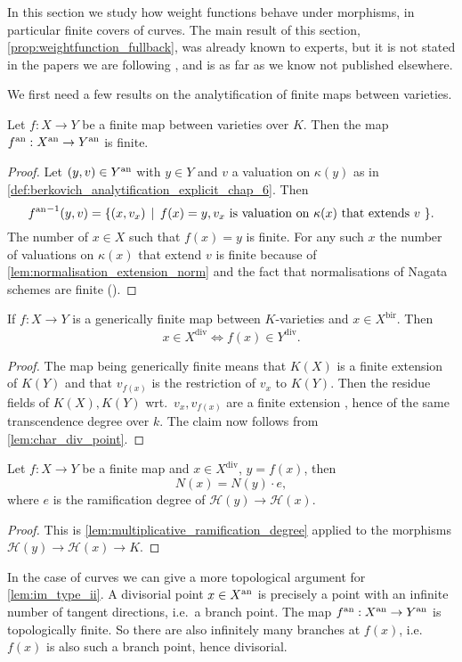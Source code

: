 In this section we study how weight functions behave under morphisms, in particular finite covers of curves. 
The main result of this section, \cref{prop:weightfunction_fullback}, was already known to experts, but it is not stated in the papers we are following \cite{bakerWeightFunctionsBerkovich2016,nicaiseBerkovichSkeletaBirational2016,mustataWeightFunctionsNonArchimedean2015}, and is as far as we know not published elsewhere. 

We first need a few results on the analytification of finite maps between varieties. 

\begin{lemma}
	Let $f: X \to Y$ be a finite map between varieties over  $K$. 
Then the map $f{}^{\text{an}}: X{}^{\text{an}} \to Y{}^{\text{an}}$ is finite. 
\end{lemma}
\begin{proof}
	Let $(y, v) \in Y{}^{\text{an}}$ with $y \in Y$ and $v$ a valuation on $\kappa(y)$ as in \cref{def:berkovich_analytification_explicit_chap_6}. 
	Then \[
		{f\an}^{-1} (y, v) = \{(x, v_x) \st f(x) = y, v_x \text{ is valuation on $\kappa(x)$ that extends $v$ }  \} 
	.\]
	The number of $x \in X$ such that $f(x) = y$ is finite. 
	For any such $x$ the number of valuations on $\kappa(x)$ that extend $v$ is finite because of \cref{lem:normalisation_extension_norm} and the fact that normalisations of Nagata schemes are finite ().
\end{proof}

\begin{lemma}\label{lem:im_type_ii}
	If $f: X \to Y$ is a generically finite map between $K$-varieties and $x \in X^{\text{bir}}$. Then
	\[
		x \in X^\text{div} \iff f(x) \in Y^\text{div}
	.\] 
\end{lemma}
\begin{proof}
	The map being generically finite means that $K(X)$ is a finite extension of $K(Y)$ and that $v_{f(x)}$ is the restriction of $v_x$ to $K(Y)$. 
	Then the residue fields of $K(X), K(Y)$ wrt.\ $v_x, v_{f(x)}$ are a finite extension , hence of the same transcendence degree over $k$. 
	The claim now follows from \cref{lem:char_div_point}.
\end{proof}
\begin{lemma}
	Let $f: X \to Y$ be a finite map and $x \in X^{\text{div}}$, $y = f(x)$, 
	then \[
		N(x) = N(y)\cdot e
	,\]
	where $e$ is the ramification degree of $\mathcal{H} (y) \to \mathcal{H} (x)$. 
\end{lemma}
\begin{proof}
	This is \cref{lem:multiplicative_ramification_degree} applied to the morphisms $\mathcal{H} (y) \to \mathcal{H} (x) \to K$.
\end{proof}
\begin{remark}
	In the case of curves we can give a more topological argument for \cref{lem:im_type_ii}. 
	A divisorial point $x \in X{}^{\text{an}}$ is precisely a point with an infinite number of tangent directions, i.e.\ a branch point.
	The map $f{}^{\text{an}}: X{}^{\text{an}} \to Y{}^{\text{an}} $ is topologically finite.
	So there are also infinitely many branches at $f(x)$, i.e.\ $f(x)$ is also such a branch point, hence divisorial. 	
\end{remark}

